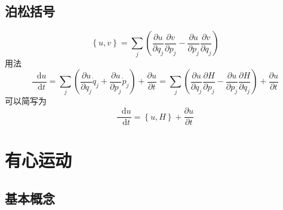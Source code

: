 \documentclass{article}
\newcommand*{\dif}{\mathop{}\!\mathrm{d}}
\begin{document}
\subsection{泊松括号}

\begin{equation}
  \label{eq:88}
  \left\{ u, v \right\} = \sum\limits_{j} \left( \dfrac{\partial u}{\partial q_{j}} \dfrac{\partial v}{\partial p_{j}} - \dfrac{\partial u}{\partial p_{j}} \dfrac{\partial v}{\partial q_{j}} \right)
\end{equation}
用法
\begin{equation}
  \label{eq:89}
  \dfrac{\dif u}{\dif t} = \sum\limits_{j} \left( \dfrac{\partial u}{\partial q_{j}} \dot{q}_{j} + \dfrac{\partial u}{\partial p_{j}} \dot{p}_{j} \right) + \dfrac{\partial u}{\partial t} = \sum\limits_{j} \left( \dfrac{\partial u}{\partial q_{j}} \dfrac{\partial H}{\partial p_{j}} - \dfrac{\partial u}{\partial p_{j}} \dfrac{\partial H}{\partial q_{j}} \right) + \dfrac{\partial u}{\partial t}
\end{equation}
可以简写为
\begin{equation}
  \label{eq:90}
  \dfrac{\dif u}{\dif t} = \left\{ u, H \right\} + \dfrac{\partial u}{\partial t}
\end{equation}

\section{有心运动}

\subsection{基本概念}
\end{document}
